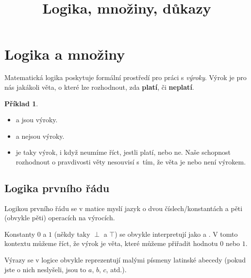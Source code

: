 \documentclass[a4paper,11pt]{article}
\title{\Huge\textsf{Logika, množiny, důkazy}\\
 \Large\textsf{}
 \author{}
 \date{}
}
\theoremstyle{definition}
\newtheorem{exm}[thm]{Příklad}
\begin{document}
\maketitle
\thispagestyle{fancy}

\section{Logika a množiny}
\label{sec:logika-a-mnoziny}

Matematická logika poskytuje formální prostředí pro práci s \emph{výroky}. Výrok
je pro nás jakákoli věta, o které lze rozhodnout, zda \textbf{platí}, či
\textbf{neplatí}.

\begin{exm}\hfill
 \begin{itemize}
  \item {} a  jsou výroky.
  \item {} a  nejsou výroky.
  \item {} je taky výrok, i když neumíme říct,
   jestli platí, nebo ne. Naše schopnost rozhodnout o pravdivosti věty nesouvisí
   s~tím, že věta je nebo není výrokem.
 \end{itemize}
\end{exm}

\subsection{Logika prvního řádu}
\label{ssec:logika-prvniho-radu}

Logikou prvního řádu se v matice myslí jazyk o dvou číslech/konstantách a pěti
(obvykle pěti) operacích na výrocích.

Konstanty $0$ a $1$ (někdy taky $\perp$ a $\top$) se obvykle interpretují jako
 a . V tomto kontextu můžeme říct, že výrok je věta, které
můžeme přiřadit hodnotu $0$ nebo $1$.

Výrazy se v logice obvykle reprezentují malými písmeny latinské abecedy
(pokud jste o nich neslyšeli, jsou to $a$, $b$, $c$, atd.).  
\end{document}
